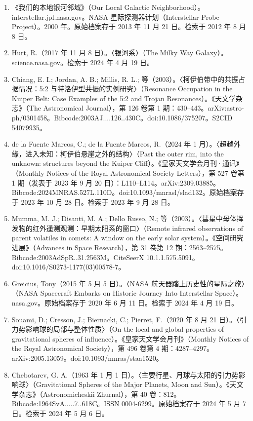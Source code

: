 \begin{enumerate}
\item 《我们的本地银河邻域》（Our Local Galactic Neighborhood）。interstellar.jpl.nasa.gov。NASA 星际探测器计划（Interstellar Probe Project）。2000 年。原始档案存于 2013 年 11 月 21 日。检索于 2012 年 8 月 8 日。
\item Hurt, R.（2017 年 11 月 8 日）。〈银河系〉（The Milky Way Galaxy）。science.nasa.gov。检索于 2024 年 4 月 19 日。
\item Chiang, E. I.; Jordan, A. B.; Millis, R. L.; 等（2003）。〈柯伊伯带中的共振占据情况：5:2 与特洛伊型共振的实例研究〉（Resonance Occupation in the Kuiper Belt: Case Examples of the 5:2 and Trojan Resonances）。《天文学杂志》（The Astronomical Journal），第 126 卷第 1 期：430–443。arXiv:astro-ph/0301458。Bibcode:2003AJ....126..430C。doi:10.1086/375207。S2CID 54079935。
\item de la Fuente Marcos, C.; de la Fuente Marcos, R.（2024 年 1 月）。〈超越外缘，进入未知：柯伊伯悬崖之外的结构〉（Past the outer rim, into the unknown: structures beyond the Kuiper Cliff）。《皇家天文学会月刊·通讯》（Monthly Notices of the Royal Astronomical Society Letters），第 527 卷第 1 期（发表于 2023 年 9 月 20 日）：L110–L114。arXiv:2309.03885。Bibcode:2024MNRAS.527L.110D。doi:10.1093/mnrasl/slad132。原始档案存于 2023 年 10 月 28 日。检索于 2023 年 9 月 28 日。
\item Mumma, M. J.; Disanti, M. A.; Dello Russo, N.; 等（2003）。〈彗星中母体挥发物的红外遥测观测：早期太阳系的窗口〉（Remote infrared observations of parent volatiles in comets: A window on the early solar system）。《空间研究进展》（Advances in Space Research），第 31 卷第 12 期：2563–2575。Bibcode:2003AdSpR..31.2563M。CiteSeerX 10.1.1.575.5091。doi:10.1016/S0273-1177(03)00578-7。
\item Greicius, Tony（2015 年 5 月 5 日）。〈NASA 航天器踏上历史性的星际之旅〉（NASA Spacecraft Embarks on Historic Journey Into Interstellar Space）。nasa.gov。原始档案存于 2020 年 6 月 11 日。检索于 2024 年 4 月 19 日。
\item Souami, D.; Cresson, J.; Biernacki, C.; Pierret, F.（2020 年 8 月 21 日）。〈引力势影响球的局部与整体性质〉（On the local and global properties of gravitational spheres of influence）。《皇家天文学会月刊》（Monthly Notices of the Royal Astronomical Society），第 496 卷第 4 期：4287–4297。arXiv:2005.13059。doi:10.1093/mnras/staa1520。
\item Chebotarev, G. A.（1963 年 1 月 1 日）。〈主要行星、月球与太阳的引力势影响球〉（Gravitational Spheres of the Major Planets, Moon and Sun）。《天文学杂志》（Astronomicheskii Zhurnal），第 40 卷：812。Bibcode:1964SvA.....7..618C。ISSN 0004-6299。原始档案存于 2024 年 5 月 7 日。检索于 2024 年 5 月 6 日。

\end{enumerate}
